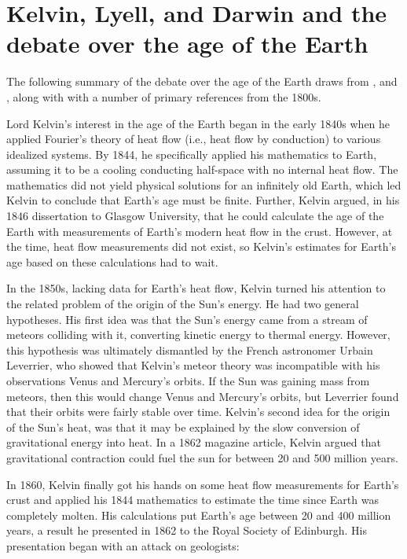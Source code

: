 \documentclass[12pt]{article}
\begin{document}
\section{Kelvin, Lyell, and Darwin and the debate over the age of the Earth} \label{sec:2}

The following summary of the debate over the age of the Earth draws from \citet{Lindley_2004}, \citet{Gould_1987} and \citet{Hallam_1989}, along with with a number of primary references from the 1800s.

Lord Kelvin's interest in the age of the Earth began in the early 1840s when he applied Fourier's theory of heat flow (i.e., heat flow by conduction) to various idealized systems. By 1844, he specifically applied his mathematics to Earth, assuming it to be a cooling conducting half-space with no internal heat flow. The mathematics did not yield physical solutions for an infinitely old Earth, which led Kelvin to conclude that Earth's age must be finite. Further, Kelvin argued, in his 1846 dissertation to Glasgow University, that he could calculate the age of the Earth with measurements of Earth's modern heat flow in the crust. However, at the time, heat flow measurements did not exist, so Kelvin's estimates for Earth's age based on these calculations had to wait.

In the 1850s, lacking data for Earth's heat flow, Kelvin turned his attention to the related problem of the origin of the Sun's energy. He had two general hypotheses. His first idea was that the Sun's energy came from a stream of meteors colliding with it, converting kinetic energy to thermal energy. However, this hypothesis was ultimately dismantled by the French astronomer Urbain Leverrier, who showed that Kelvin's meteor theory was incompatible with his observations Venus and Mercury's orbits. If the Sun was gaining mass from meteors, then this would change Venus and Mercury's orbits, but Leverrier found that their orbits were fairly stable over time. Kelvin's second idea for the origin of the Sun's heat, was that it may be explained by the slow conversion of gravitational energy into heat. In a 1862 magazine article, Kelvin argued that gravitational contraction could fuel the sun for between 20 and 500 million years.

In 1860, Kelvin finally got his hands on some heat flow measurements for Earth's crust and applied his 1844 mathematics to estimate the time since Earth was completely molten. His calculations put Earth's age between 20 and 400 million years, a result he presented in 1862 to the Royal Society of Edinburgh. His presentation began with an attack on geologists: 
\end{document}
